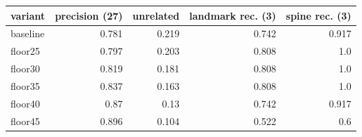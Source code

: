 \begin{tabular}{lrrrr}
\toprule
variant & precision (27) & unrelated & landmark rec. (3) & spine rec. (3) \\
\midrule
baseline & 0.781 & 0.219 & 0.742 & 0.917 \\
floor25 & 0.797 & 0.203 & 0.808 & 1.0 \\
floor30 & 0.819 & 0.181 & 0.808 & 1.0 \\
floor35 & 0.837 & 0.163 & 0.808 & 1.0 \\
floor40 & 0.87 & 0.13 & 0.742 & 0.917 \\
floor45 & 0.896 & 0.104 & 0.522 & 0.6 \\
\bottomrule
\end{tabular}
